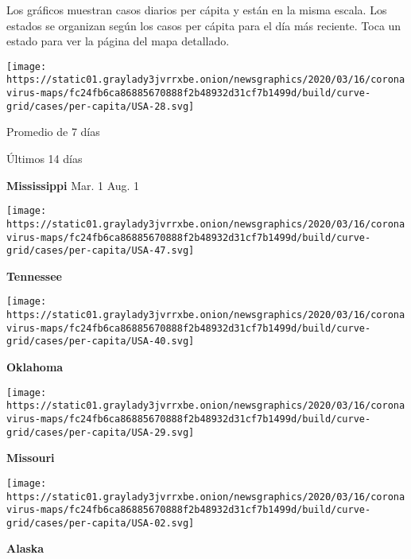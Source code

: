 Los gráficos muestran casos diarios per cápita y están en la misma
escala. Los estados se organizan según los casos per cápita para el día
más reciente. Toca un estado para ver la página del mapa detallado.

\href{https://www.nytimes3xbfgragh.onion/interactive/2020/us/mississippi-coronavirus-cases.html}{}

\texttt{[image: https://static01.graylady3jvrrxbe.onion/newsgraphics/2020/03/16/coronavirus-maps/fc24fb6ca86885670888f2b48932d31cf7b1499d/build/curve-grid/cases/per-capita/USA-28.svg]}

Promedio de 7 días

Últimos 14 días

\textbf{Mississippi} Mar. 1 Aug. 1

\href{https://www.nytimes3xbfgragh.onion/interactive/2020/us/tennessee-coronavirus-cases.html}{}

\texttt{[image: https://static01.graylady3jvrrxbe.onion/newsgraphics/2020/03/16/coronavirus-maps/fc24fb6ca86885670888f2b48932d31cf7b1499d/build/curve-grid/cases/per-capita/USA-47.svg]}

\textbf{Tennessee}

\href{https://www.nytimes3xbfgragh.onion/interactive/2020/us/oklahoma-coronavirus-cases.html}{}

\texttt{[image: https://static01.graylady3jvrrxbe.onion/newsgraphics/2020/03/16/coronavirus-maps/fc24fb6ca86885670888f2b48932d31cf7b1499d/build/curve-grid/cases/per-capita/USA-40.svg]}

\textbf{Oklahoma}

\href{https://www.nytimes3xbfgragh.onion/interactive/2020/us/missouri-coronavirus-cases.html}{}

\texttt{[image: https://static01.graylady3jvrrxbe.onion/newsgraphics/2020/03/16/coronavirus-maps/fc24fb6ca86885670888f2b48932d31cf7b1499d/build/curve-grid/cases/per-capita/USA-29.svg]}

\textbf{Missouri}

\href{https://www.nytimes3xbfgragh.onion/interactive/2020/us/alaska-coronavirus-cases.html}{}

\texttt{[image: https://static01.graylady3jvrrxbe.onion/newsgraphics/2020/03/16/coronavirus-maps/fc24fb6ca86885670888f2b48932d31cf7b1499d/build/curve-grid/cases/per-capita/USA-02.svg]}

\textbf{Alaska}

\href{https://www.nytimes3xbfgragh.onion/interactive/2020/us/north-dakota-coronavirus-cases.html}{}

